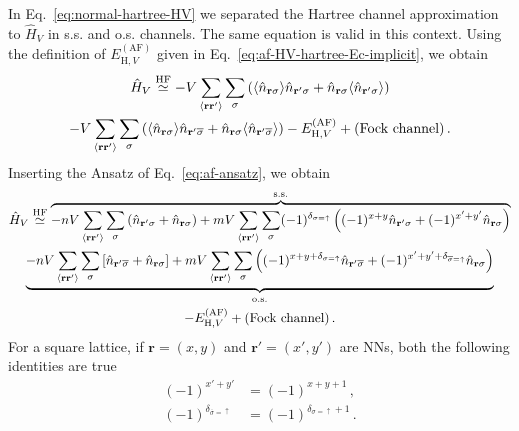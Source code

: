 \begin{tabproof}
	
	In Eq.~\eqref{eq:normal-hartree-HV} we separated the Hartree channel approximation to $\hat H_V$ in s.s. and o.s. channels. The same equation is valid in this context. Using the definition of $E_{\mathrm{H},V}^{(\mathrm{AF})}$ given in Eq.~\eqref{eq:af-HV-hartree-Ec-implicit}, we obtain
	\begin{multline}
		\hat H_V \HFsimeq
		-V \sum_{\ev{\mathbf{r}\mathbf{r}'}} \sum_\sigma \left(
		\langle
		\hat n_{\mathbf{r}\sigma}
		\rangle \hat n_{\mathbf{r}'\sigma} + \hat n_{\mathbf{r}\sigma} \langle
		\hat n_{\mathbf{r}'\sigma}
		\rangle
		\right) \\
		-V \sum_{\ev{\mathbf{r}\mathbf{r}'}} \sum_\sigma \left(
		\langle
		\hat n_{\mathbf{r}\sigma}
		\rangle \hat  n_{\mathbf{r}'\overline{\sigma}} + \hat n_{\mathbf{r}\sigma} \langle
		\hat n_{\mathbf{r}'\overline{\sigma}}
		\rangle
		\right)
		- E_{\mathrm{H},V}^{(\mathrm{AF})} \label{eq:af-V-wick-decomposition-operatorial} + (\text{Fock channel}) \, .
	\end{multline}
	Inserting the Ansatz of Eq.~\eqref{eq:af-ansatz}, we obtain
	\begin{multline}
		\hat H_V \HFsimeq
		\overbrace{
			-nV \sum_{\ev{\mathbf{r}\mathbf{r}'}} \sum_\sigma \left(
			\hat n_{\mathbf{r}'\sigma} + \hat n_{\mathbf{r}\sigma}
			\right) 
			+ mV \sum_{\ev{\mathbf{r}\mathbf{r}'}} \sum_\sigma (-1)^{\delta_{\sigma=\uparrow}} \left(
			(-1)^{x+y} \hat n_{\mathbf{r}'\sigma} + (-1)^{x'+y'} \hat n_{\mathbf{r}\sigma}
			\right)
		}^{\mathrm{s.s.}} \\
		\underbrace{
			-nV \sum_{\ev{\mathbf{r}\mathbf{r}'}} \sum_\sigma \left[
			\hat n_{\mathbf{r}'\overline{\sigma}} + \hat n_{\mathbf{r}\sigma}
			\right] + mV \sum_{\ev{\mathbf{r}\mathbf{r}'}} \sum_\sigma \left(
			(-1)^{x+y+\delta_{\sigma=\uparrow}} \hat n_{\mathbf{r}'\overline{\sigma}} + (-1)^{x'+y'+\delta_{\overline{\sigma}=\uparrow}} \hat n_{\mathbf{r}\sigma}
			\right)
		}_{\mathrm{o.s.}} \\
		- E_{\mathrm{H},V}^{(\mathrm{AF})} + (\text{Fock channel}) \label{eq:af-ehm-hartree-int-0} \, .
	\end{multline}
	For a square lattice, if $\mathbf{r} = (x,y)$ and $\mathbf{r}' = (x',y')$ are NNs, both the following identities are true
	\[
	\begin{aligned}
		(-1)^{x'+y'} &= (-1)^{x+y+1} \, , \\
		(-1)^{\delta_{\overline{\sigma}=\uparrow}} &= (-1)^{\delta_{\sigma=\uparrow}+1} \, .

\end{aligned}\]
\end{tabproof}
